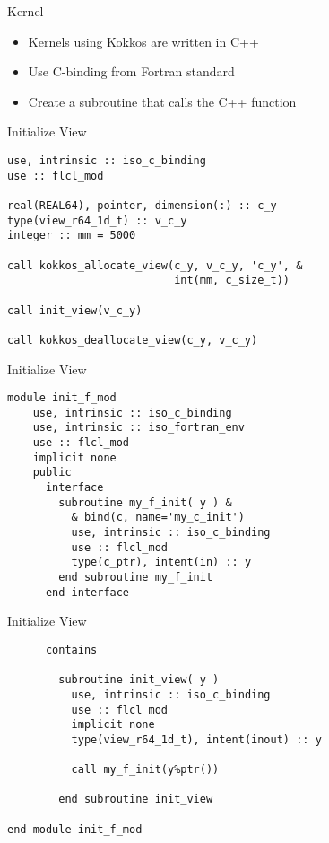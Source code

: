\begin{frame}{Kernel}
  \begin{itemize}
    \item Kernels using Kokkos are written in C++
    \item Use C-binding from Fortran standard 
    \item Create a subroutine that calls the C++ function
  \end{itemize}
\end{frame}

\begin{frame}[containsverbatim]{Initialize View}
  \begin{verbatim}
use, intrinsic :: iso_c_binding
use :: flcl_mod

real(REAL64), pointer, dimension(:) :: c_y
type(view_r64_1d_t) :: v_c_y
integer :: mm = 5000

call kokkos_allocate_view(c_y, v_c_y, 'c_y', &
                          int(mm, c_size_t))

call init_view(v_c_y)

call kokkos_deallocate_view(c_y, v_c_y)
  \end{verbatim}
\end{frame}

\begin{frame}[containsverbatim]{Initialize View}
  \begin{verbatim}
module init_f_mod
    use, intrinsic :: iso_c_binding
    use, intrinsic :: iso_fortran_env
    use :: flcl_mod
    implicit none
    public
      interface
        subroutine my_f_init( y ) &
          & bind(c, name='my_c_init')
          use, intrinsic :: iso_c_binding
          use :: flcl_mod
          type(c_ptr), intent(in) :: y
        end subroutine my_f_init
      end interface
  \end{verbatim}
\end{frame}

\begin{frame}[containsverbatim]{Initialize View}
  \begin{verbatim}
      contains

        subroutine init_view( y )
          use, intrinsic :: iso_c_binding
          use :: flcl_mod
          implicit none
          type(view_r64_1d_t), intent(inout) :: y

          call my_f_init(y%ptr())

        end subroutine init_view
  
end module init_f_mod
  \end{verbatim}
\end{frame}

